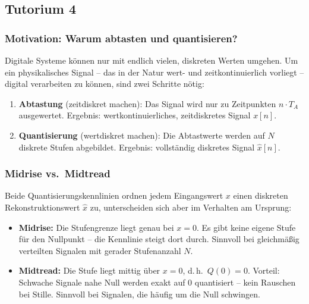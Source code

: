 
\subsection{Tutorium 4}

\subsubsection*{Motivation: Warum abtasten und quantisieren?}

Digitale Systeme können nur mit endlich vielen, diskreten Werten umgehen. Um ein physikalisches
Signal – das in der Natur wert- und zeitkontinuierlich vorliegt – digital verarbeiten zu können,
sind zwei Schritte nötig:

\begin{enumerate}
    \item \textbf{Abtastung} (zeitdiskret machen): Das Signal wird nur zu Zeitpunkten $n \cdot T_A$
          ausgewertet. Ergebnis: wertkontinuierliches, zeitdiskretes Signal $x[n]$.
    \item \textbf{Quantisierung} (wertdiskret machen): Die Abtastwerte werden auf $N$ diskrete
          Stufen abgebildet. Ergebnis: vollständig diskretes Signal $\hat{x}[n]$.
\end{enumerate}

\subsubsection*{Midrise vs.\ Midtread}

Beide Quantisierungskennlinien ordnen jedem Eingangswert $x$ einen diskreten Rekonstruktionswert
$\hat{x}$ zu, unterscheiden sich aber im Verhalten am Ursprung:

\begin{itemize}
    \item \textbf{Midrise:} Die Stufengrenze liegt genau bei $x = 0$. Es gibt keine eigene Stufe
          für den Nullpunkt – die Kennlinie steigt dort durch. Sinnvoll bei gleichmäßig verteilten
          Signalen mit gerader Stufenanzahl $N$.
    \item \textbf{Midtread:} Die Stufe liegt mittig über $x = 0$, d.\,h.\ $Q(0) = 0$. Vorteil:
          Schwache Signale nahe Null werden exakt auf $0$ quantisiert – kein Rauschen bei Stille.
          Sinnvoll bei Signalen, die häufig um die Null schwingen.
\end{itemize}

